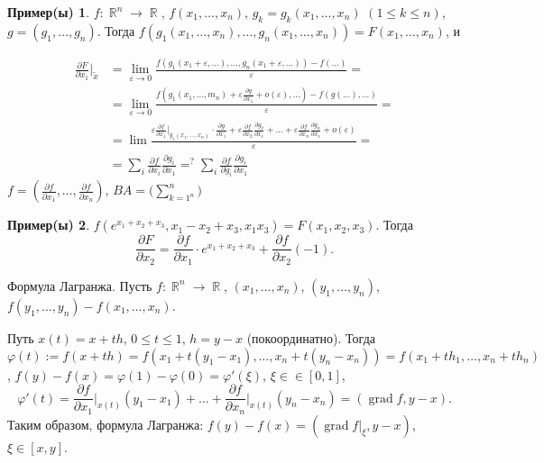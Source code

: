 \documentclass[a4paper,100pt]{article}
\theoremstyle{indented}
\theoremstyle{definition}
\newtheorem{exl}{Пример(ы)}
\theoremstyle{remark}
\DeclareMathOperator{\RR}{\mathbb{R}}
\DeclareMathOperator{\grad}{grad}
\begin{document}
\begin{exl}
    $f:\RR^n\rightarrow \RR$, $f(x_1, \ldots, x_n)$, $g_k= g_k(x_1, \ldots, x_n)$ $(1\leq k\leq n)$, $g=(g_1, \ldots, g_n)$. Тогда $f(g_1(x_1, \ldots, x_n), \ldots, g_n(x_1, \ldots, x_n))=F(x_1, \ldots, x_n)$, и 
    
\begin{equation*}
    \begin{aligned}
            \frac{\partial F}{\partial x_1}\bigg|_{\tilde{x}} & = \lim_{\varepsilon \rightarrow 0}\frac{f(g_1(x_1+\varepsilon, \ldots), \ldots, g_n(x_1+\varepsilon, \ldots))- f(\ldots)}{\varepsilon} = \\
            & = \lim_{\varepsilon\rightarrow 0}\frac{f(g_1(x_1, \ldots, m_n)+\varepsilon\frac{\partial g}{\partial x_1}+o(\varepsilon), \ldots)-f(g(\ldots), \ldots)}{\varepsilon} = \\ 
            & = \lim\frac{\varepsilon\frac{\partial f}{\partial x_1}\bigg|_{g_1(x_1, \ldots, x_n)}\cdot\frac{\partial g}{\partial x_1}+\varepsilon\frac{\partial f}{\partial x_2}\frac{\partial g_2}{\partial x_1}+\ldots+\varepsilon\frac{\partial f}{\partial x_n}\frac{\partial g_n}{\partial x_1}+o(\varepsilon)}{\varepsilon} = \\ 
            & = \sum_i \frac{\partial f}{\partial x_i}\frac{\partial g_i}{\partial x_1} =^? \sum_i \frac{\partial f}{\partial g_i}\frac{\partial g_i}{\partial x_1}
    \end{aligned}
\end{equation*}
    $f=(\frac{\partial f}{\partial x_1}, \ldots, \frac{\partial f}{\partial x_n})$, $BA=\biggl(\sum_{k=1^n}^n\biggr)$
\end{exl}

\begin{exl}
    $f(e^{x_1+x_2+x_3}, x_1-x_2+x_3, x_1x_3) = F(x_1, x_2, x_3)$. Тогда 
    \[
        \frac{\partial F}{\partial x_2}= \frac{\partial f}{\partial x_1}\cdot e^{x_1+x_2+x_3}+\frac{\partial f}{\partial x_2}(-1). 
    \]
\end{exl}

Формула Лагранжа. Пусть $f:\RR^n\rightarrow \RR$, $(x_1, \ldots, x_n)$, $(y_1, \ldots, y_n)$, $f(y_1, \ldots, y_n)- f(x_1, \ldots, x_n)$. \ 

Путь $x(t)= x+th$, $0\leq t\leq 1$, $h=y-x$ (покоординатно). Тогда $\varphi(t) := f(x+th)=f(x_1+t(y_1-x_1), \ldots, x_n+t(y_n-x_n))= f(x_1+th_1, \ldots, x_n+th_n)$, $f(y)-f(x)= \varphi(1)-\varphi(0)= \varphi'(\xi)$, $\xi\in\in[0, 1]$, 
\[
    \varphi'(t)= \frac{\partial f}{\partial x_1}\bigg|_{x(t)}(y_1-x_1)+\ldots+\frac{\partial f}{\partial x_n}\bigg|_{x(t)}(y_n-x_n)= (\grad f, y-x). 
\]
Таким образом, формула Лагранжа: $f(y)-f(x)=(\grad f|_\xi, y-x)$, $\xi\in[x, y]$. \ 
\end{document}
